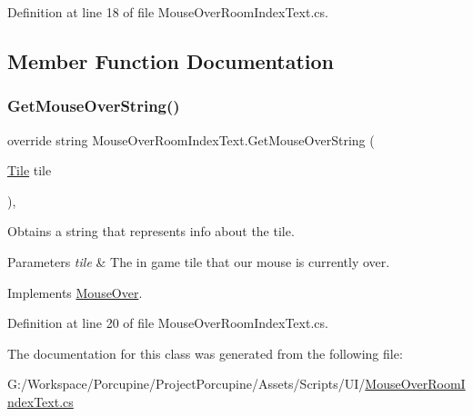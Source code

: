 Definition at line 18 of file Mouse\+Over\+Room\+Index\+Text.\+cs.



\subsection{Member Function Documentation}
\mbox{\label{class_mouse_over_room_index_text_ac6c8ed4b482cbb570fc8989640d622db}} 
\subsubsection{\texorpdfstring{Get\+Mouse\+Over\+String()}{GetMouseOverString()}}
{\footnotesize\ttfamily override string Mouse\+Over\+Room\+Index\+Text.\+Get\+Mouse\+Over\+String (\begin{DoxyParamCaption}\item[{\hyperlink{class_tile}{Tile}}]{tile }\end{DoxyParamCaption})\hspace{0.3cm}{\ttfamily [protected]}, {\ttfamily [virtual]}}



Obtains a string that represents info about the tile. 


\begin{DoxyParams}{Parameters}
{\em tile} & The in game tile that our mouse is currently over.\\
\hline
\end{DoxyParams}


Implements \hyperlink{class_mouse_over_a9878f4e4b19afa1056f4386aa0e67452}{Mouse\+Over}.



Definition at line 20 of file Mouse\+Over\+Room\+Index\+Text.\+cs.



The documentation for this class was generated from the following file\+:\begin{DoxyCompactItemize}
\item 
G\+:/\+Workspace/\+Porcupine/\+Project\+Porcupine/\+Assets/\+Scripts/\+U\+I/\hyperlink{_mouse_over_room_index_text_8cs}{Mouse\+Over\+Room\+Index\+Text.\+cs}\end{DoxyCompactItemize}
